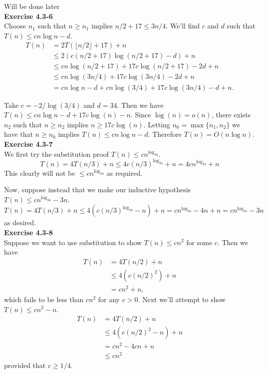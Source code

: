 \documentclass{article}
\begin{document}
Will be done later\\

\noindent\textbf{Exercise 4.3-6}\\

Choose $n_1$ such that $n \geq n_1$ implies $n/2 + 17 \leq 3n/4$.  We'll find $c$ and $d$ such that $T(n) \leq cn\log n - d$.
\begin{align*}
T(n) &= 2T(\lfloor n/2 \rfloor + 17) + n \\
&\leq 2(c(n/2 + 17)\log(n/2 + 17) - d) + n \\
&\leq cn\log(n/2 + 17) + 17c\log(n/2 + 17) - 2d + n \\
&\leq cn\log(3n/4) + 17c\log(3n/4) - 2d + n\\
&= cn\log n - d +cn\log(3/4) + 17c\log(3n/4) - d + n.
\end{align*}

Take $c = -2/\log(3/4)$ and $d =34$.  Then we have $T(n) \leq cn\log n - d + 17c\log(n) - n$.  Since $\log(n) = o(n)$, there exists $n_2$ such that $n \geq n_2$ implies $n \geq 17c\log(n)$.  Letting $n_0 = \max\{n_1, n_2\}$ we have that $n \geq n_0$ implies $T(n) \leq cn\log n - d$.  Therefore $T(n) = O(n \log n)$. \\

\noindent\textbf{Exercise 4.3-7}\\

We first try the substitution proof $T(n) \le cn^{\log_34}$.
\[
T(n) = 4T(n/3)+n \le 4 c(n/3)^{\log_34}+n = 4cn^{\log_34}+n
\]
This clearly will not be $\le cn^{\log_34}$ as required.

Now, suppose instead that we make our inductive hypothesis $T(n) \le cn^{\log_34} -3n$.
\[
T(n) = 4T(n/3)+n \le 4(c(n/3)^{\log_34}-n) +n = cn^{\log_34} - 4n + n =cn^{\log_34} - 3n 
\]
as desired.\\


\noindent\textbf{Exercise 4.3-8} \\

Suppose we want to use substitution to show $T(n) \leq cn^2$ for some $c$.  Then we have
\begin{align*}
T(n) &= 4T(n/2) + n \\
&\leq 4(c(n/2)^2) + n \\
&= cn^2 + n,
\end{align*}
which fails to be less than $cn^2$ for any $c > 0$.  Next we'll attempt to show $T(n) \leq cn^2 - n$.
\begin{align*}
T(n)&= 4T(n/2) + n\\
& \leq 4(c(n/2)^2 - n) + n \\
&= cn^2 - 4cn + n \\
&\leq cn^2 
\end{align*}
provided that $c \geq 1/4$.  \\
\end{document}
